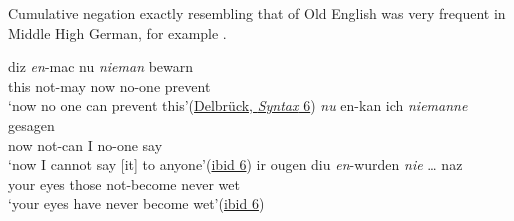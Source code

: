 Cumulative negation exactly resembling that of Old English was very frequent in Middle High German, for example .

\ea \label{ex:07-21}
\ea{}
\gll diz \emph{en}-mac nu \emph{nieman} bewarn\\ %
 this not-may now no-one prevent\\
\glt `now no one can prevent this'\hfill(\href{https://archive.org/details/germanische-syntax-i-zu-den-negativen-s/page/n13/mode/2up?q=%22nieman+bewarn%22&view=theater}{Delbrück, \textit{Syntax} 6}) 
\ex 
\gll \emph{nu} en-kan ich \emph{niemanne} gesagen\\
 now not-can I no-one say\\
\glt `now I cannot say [it] to anyone'\hfill(\href{https://archive.org/details/germanische-syntax-i-zu-den-negativen-s/page/n13/mode/2up?q=%22nu+enkan+ich+niemanne+gesagen%22&view=theater}{ibid 6})
\ex 
\gll ir ougen diu \emph{en}-wurden \emph{nie} {\dots} naz\\ %
 your eyes those not-become never {} wet\\
\glt `your eyes have never become wet'\hfill(\href{https://archive.org/details/germanische-syntax-i-zu-den-negativen-s/page/n13/mode/2up?q=%22ir+ougen+diu%22&view=theater}{ibid 6})
\z
\z{}


